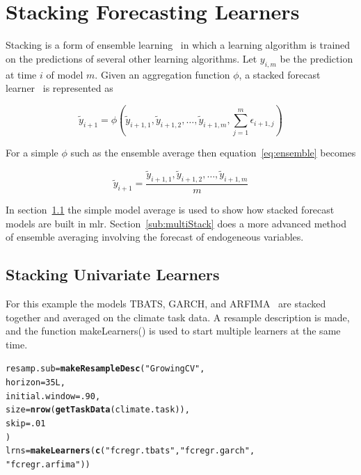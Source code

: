 \documentclass[12pt]{article}\usepackage[]{graphicx}\usepackage[]{color}
\makeatletter
\newcommand{\hlnum}[1]{\textcolor[rgb]{0.686,0.059,0.569}{#1}}%
\newcommand{\hlstr}[1]{\textcolor[rgb]{0.192,0.494,0.8}{#1}}%
\newcommand{\hlstd}[1]{\textcolor[rgb]{0.345,0.345,0.345}{#1}}%
\newcommand{\hlkwb}[1]{\textcolor[rgb]{0.69,0.353,0.396}{#1}}%
\newcommand{\hlkwc}[1]{\textcolor[rgb]{0.333,0.667,0.333}{#1}}%
\newcommand{\hlkwd}[1]{\textcolor[rgb]{0.737,0.353,0.396}{\textbf{#1}}}%
\newenvironment{kframe}{%
 \def\at@end@of@kframe{}%
 \ifinner\ifhmode%
  \def\at@end@of@kframe{\end{minipage}}%
  \begin{minipage}{\columnwidth}%
 \fi\fi%
 \def\FrameCommand##1{\hskip\@totalleftmargin \hskip-\fboxsep
 \colorbox{shadecolor}{##1}\hskip-\fboxsep
     \hskip-\linewidth \hskip-\@totalleftmargin \hskip\columnwidth}%
 \MakeFramed {\advance\hsize-\width
   \@totalleftmargin\z@ \linewidth\hsize
   \@setminipage}}%
 {\par\unskip\endMakeFramed%
 \at@end@of@kframe}
\newenvironment{knitrout}{}{} %
\theoremstyle{definition}
\newcommand\code{\@codex}
\def\@codex#1{{\normalfont\ttfamily\hyphenchar\font=-1 #1}}
\newcommand{\pkg}[1]{{\fontseries{b}\selectfont #1}}
\makeatother
\begin{document}
\section{Stacking Forecasting Learners}

Stacking is a form of ensemble learning~\cite{ensembleOverview} in which a learning algorithm is trained on the predictions of several other learning algorithms. Let $y_{i,m}$ be the prediction at time $i$ of model $m$. Given an aggregation function $\phi$, a stacked forecast learner~\cite{combineForecast} is represented as

\begin{equation}
\tilde{y}_{i+1} = \phi(\tilde{y}_{i+1,1}, \tilde{y}_{i+1,2},\dots, \tilde{y}_{i+1,m}, \sum_{j=1}^m \epsilon_{i+1,j})
\label{eq:ensemble}
\end{equation}

For a simple $\phi$ such as the ensemble average then equation~\ref{eq:ensemble} becomes

\begin{equation}
\tilde{y}_{i+1} = \frac{\tilde{y}_{i+1,1}, \tilde{y}_{i+1,2},\dots, \tilde{y}_{i+1,m}}{m}
\label{eq:ensembleAverage}
\end{equation}

In section~\ref{sub:stackedUnivar} the simple model average is used to show how stacked forecast models are built in \pkg{mlr}. Section~\ref{sub:multiStack} does a more advanced method of ensemble averaging involving the forecast of endogeneous variables.

\subsection{Stacking Univariate Learners}
\label{sub:stackedUnivar}

For this example the models TBATS, GARCH, and ARFIMA~\cite{arfima} are stacked together and averaged on the climate task data. A resample description is made, and the function \code{makeLearners()} is used to start multiple learners at the same time.

\singlespacing
\begin{knitrout}
\color{fgcolor}\begin{kframe}
\begin{alltt}
\hlstd{resamp.sub} \hlkwb{=} \hlkwd{makeResampleDesc}\hlstd{(}\hlstr{"GrowingCV"}\hlstd{,}
                          \hlkwc{horizon} \hlstd{=} \hlnum{35L}\hlstd{,}
                          \hlkwc{initial.window} \hlstd{=} \hlnum{.90}\hlstd{,}
                          \hlkwc{size} \hlstd{=} \hlkwd{nrow}\hlstd{(}\hlkwd{getTaskData}\hlstd{(climate.task)),}
                          \hlkwc{skip} \hlstd{=} \hlnum{.01}
                          \hlstd{)}
\hlstd{lrns} \hlkwb{=} \hlkwd{makeLearners}\hlstd{(}\hlkwd{c}\hlstd{(}\hlstr{"fcregr.tbats"}\hlstd{,}\hlstr{"fcregr.garch"}\hlstd{,}
                      \hlstr{"fcregr.arfima"}\hlstd{))}
\end{alltt}
\end{kframe}
\end{knitrout}
\doublespacing
\end{document}
